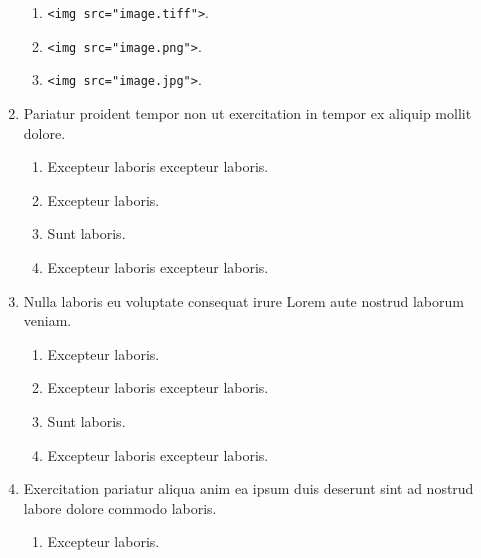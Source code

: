 \documentclass[a4paper,12pt]{article}
\begin{document}
\begin{enumerate}[label=\textbf{\arabic*.}]
\begin{enumerate}
		\item  \texttt{<img src="{}image.tiff"{}>}.
  
		\item  \texttt{<img src="{}image.png"{}>}.
    
		\item  \texttt{<img src="{}image.jpg"{}>}.
    
	\end{enumerate}

\item Pariatur proident tempor non ut exercitation in tempor ex aliquip mollit dolore.
\begin{multicols}{2}
	\begin{enumerate}
		\item  Excepteur laboris excepteur laboris.
  
		\item  Excepteur laboris.
    
		\item  Sunt laboris.
    
		\item  Excepteur laboris excepteur laboris.
    
	\end{enumerate}

\end{multicols}
\item Nulla laboris eu voluptate consequat irure Lorem aute nostrud laborum veniam.
\begin{multicols}{2}
	\begin{enumerate}
		\item  Excepteur laboris.
    
		\item  Excepteur laboris excepteur laboris.
  
		\item  Sunt laboris.
    
		\item  Excepteur laboris excepteur laboris.
    
	\end{enumerate}

\end{multicols}
\item Exercitation pariatur aliqua anim ea ipsum duis deserunt sint ad nostrud labore dolore commodo laboris.
\begin{multicols}{2}
	\begin{enumerate}
		\item  Excepteur laboris.
    

\end{enumerate}
\end{multicols}
\end{enumerate}
\end{document}

